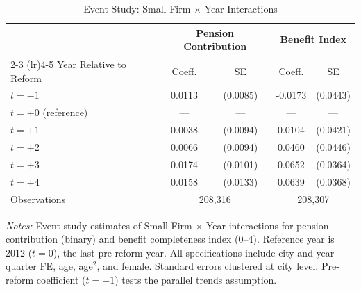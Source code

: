 \begin{table}[htbp]
\centering
\caption{Event Study: Small Firm $\times$ Year Interactions}
\label{tab:event}
\begin{tabular}{lcccc}
\toprule
 & \multicolumn{2}{c}{Pension Contribution} & \multicolumn{2}{c}{Benefit Index} \\
\cmidrule(lr){2-3} \cmidrule(lr){4-5}
Year Relative to Reform & Coeff. & SE & Coeff. & SE \\
\midrule
$t = -1$ & 0.0113 & (0.0085) & -0.0173 & (0.0443) \\
$t = +0$ (reference) & --- & --- & --- & --- \\
$t = +1$ & 0.0038 & (0.0094) & 0.0104 & (0.0421) \\
$t = +2$ & 0.0066 & (0.0094) & 0.0460 & (0.0446) \\
$t = +3$ & 0.0174 & (0.0101) & 0.0652 & (0.0364) \\
$t = +4$ & 0.0158 & (0.0133) & 0.0639 & (0.0368) \\
\midrule
Observations & \multicolumn{2}{c}{208,316} & \multicolumn{2}{c}{208,307} \\
\bottomrule
\end{tabular}
\begin{tablenotes}
\item \textit{Notes:} Event study estimates of Small Firm $\times$ Year interactions for pension contribution (binary) and benefit completeness index (0--4). Reference year is 2012 ($t=0$), the last pre-reform year. All specifications include city and year-quarter FE, age, age$^2$, and female. Standard errors clustered at city level. Pre-reform coefficient ($t=-1$) tests the parallel trends assumption.
\end{tablenotes}
\end{table}
